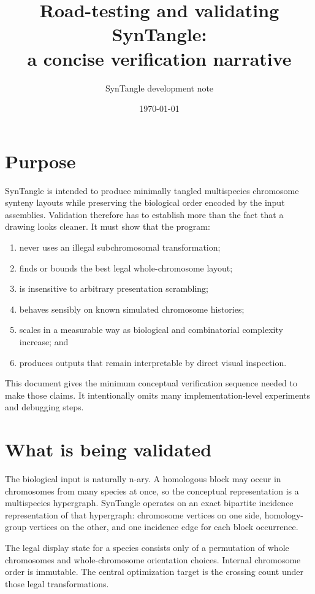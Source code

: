 \documentclass[11pt]{article}
\title{Road-testing and validating SynTangle:\\
a concise verification narrative}
\author{SynTangle development note}
\date{\today}
\begin{document}
\maketitle

\section{Purpose}

SynTangle is intended to produce minimally tangled multispecies chromosome
synteny layouts while preserving the biological order encoded by the input
assemblies.  Validation therefore has to establish more than the fact that a
drawing looks cleaner.  It must show that the program:

\begin{enumerate}
  \item never uses an illegal subchromosomal transformation;
  \item finds or bounds the best legal whole-chromosome layout;
  \item is insensitive to arbitrary presentation scrambling;
  \item behaves sensibly on known simulated chromosome histories;
  \item scales in a measurable way as biological and combinatorial complexity
        increase; and
  \item produces outputs that remain interpretable by direct visual inspection.
\end{enumerate}

This document gives the minimum conceptual verification sequence needed to
make those claims.  It intentionally omits many implementation-level
experiments and debugging steps.

\section{What is being validated}

The biological input is naturally n-ary.  A homologous block may occur in
chromosomes from many species at once, so the conceptual representation is a
multispecies hypergraph.  SynTangle operates on an exact bipartite incidence
representation of that hypergraph: chromosome vertices on one side,
homology-group vertices on the other, and one incidence edge for each block
occurrence.

The legal display state for a species consists only of a permutation of whole
chromosomes and whole-chromosome orientation choices.  Internal chromosome
order is immutable.  The central optimization target is the crossing count
under those legal transformations.
\end{document}
